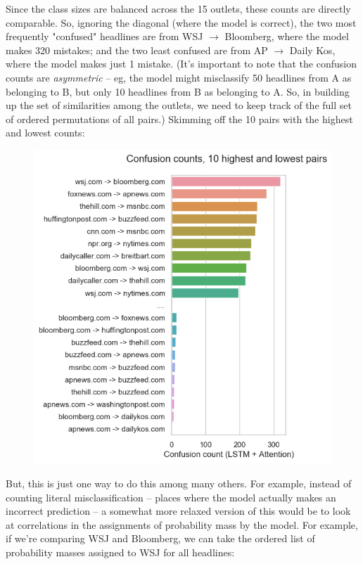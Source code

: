 \documentclass{scrartcl}
\begin{document}
Since the class sizes are balanced across the 15 outlets, these counts are directly comparable. So, ignoring the diagonal (where the model is correct), the two most frequently "confused" headlines are from WSJ $\rightarrow$ Bloomberg, where the model makes 320 mistakes; and the two least confused are from AP $\rightarrow$ Daily Kos, where the model makes just 1 mistake. (It's important to note that the confusion counts are \textit{asymmetric} -- eg, the model might misclassify 50 headlines from A as belonging to B, but only 10 headlines from B as belonging to A. So, in building up the set of similarities among the outlets, we need to keep track of the full set of ordered permutations of all pairs.) Skimming off the 10 pairs with the highest and lowest counts:

\begin{figure}[H]
  \centering
  \includegraphics[height=0.4\textheight]{figures/hlg-cc-tb10.png}
\end{figure}

But, this is just one way to do this among many others. For example, instead of counting literal misclassification -- places where the model actually makes an incorrect prediction -- a somewhat more relaxed version of this would be to look at correlations in the assignments of probability mass by the model. For example, if we're comparing WSJ and Bloomberg, we can take the ordered list of probability masses assigned to WSJ for all headlines:
\end{document}
